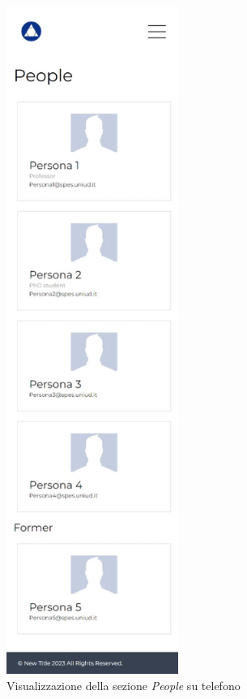\documentclass[target=bach,aauheader=]{thud}
\begin{document}
\begin{figure}
\begin{minipage}{0.5\textwidth}
      \includegraphics[width = 0.5\textwidth]{images/people-telefono.png}
      \caption{Visualizzazione della sezione \textit{People} su telefono} 
      \label{img:computert}
    \end{minipage}
\end{figure}
\end{document}
